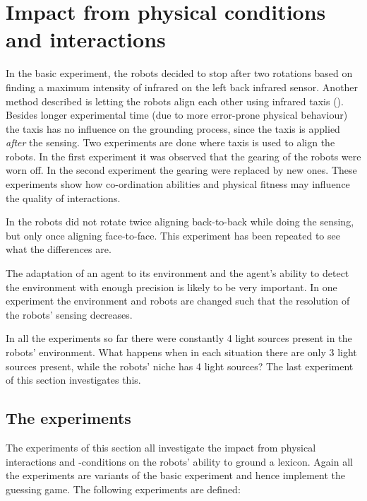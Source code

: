 \section{Impact from physical conditions and interactions}\label{s:par:int}


In the basic experiment, the robots decided to stop after two rotations based on finding a maximum intensity of infrared on the left back infrared sensor. Another method described is letting the robots align each other using infrared taxis (). Besides longer experimental time (due to more error-prone physical behaviour) the taxis has no influence on the grounding process, since the taxis is applied {\em after} the sensing. Two experiments are done where taxis is used to align the robots. In the first experiment it was observed that the gearing of the robots were worn off. In the second experiment the gearing were replaced by new ones. These experiments show how co-ordination abilities and physical fitness may influence the quality of interactions.

In \citealt{steelsvogt:1997} the robots did not rotate twice aligning back-to-back while doing the sensing, but only once aligning face-to-face. This experiment has been repeated to see what the differences are.

The adaptation of an agent to its environment and the agent's ability to detect the environment with enough precision is likely to be very important. In one experiment the environment and robots are changed such that the resolution of the robots' sensing decreases.

In all the experiments so far there were constantly 4 light sources present in the robots' environment. What happens when in each situation there are only 3 light sources present, while the robots' niche has 4 light sources? The last experiment of this section investigates this.

\subsection{The experiments}

The experiments of this section all investigate the impact from physical interactions and -conditions on the robots' ability to ground a lexicon. Again all the experiments are variants of the basic experiment and hence implement the guessing game. The following experiments are defined:

